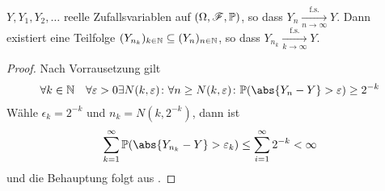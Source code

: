 \begin{conclusion}
	 $Y,Y_1,Y_2, \dots$ reelle Zufallsvariablen auf $(\Omega,\mathscr F,\mathbb{P})$, so dass $Y_n \xrightarrow[n \to \infty]{\text{f.s.}}Y$. Dann existiert eine Teilfolge $(Y_{n_k})_{k \in \mathbb{N}} \subseteq (Y_n)_{n\in \mathbb{N}}$, so dass $Y_{n_k} \xrightarrow[k \to \infty]{\text{f.s.}} Y$.
\end{conclusion}
\begin{proof}
	Nach Vorrausetzung gilt
	\begin{align*}
		\forall k \in \N \quad \forall \epsilon > 0 \exists N(k,\epsilon)\colon \forall n \ge N(k,\epsilon)\colon \P(\abs{Y_n - Y}>\epsilon)\ge 2^{-k}
	\end{align*}
	Wähle $\epsilon_k = 2^{-k}$ und $n_k = N(k,2^{-k})$, dann ist
	\begin{align*}
		\sum_{k=1}^{\infty} \P(\abs{Y_{n_k} - Y} > \epsilon_k) \le \sum_{i=1}^{\infty} 2^{-k} < \infty
	\end{align*}
	und die Behauptung folgt aus .
\end{proof}
